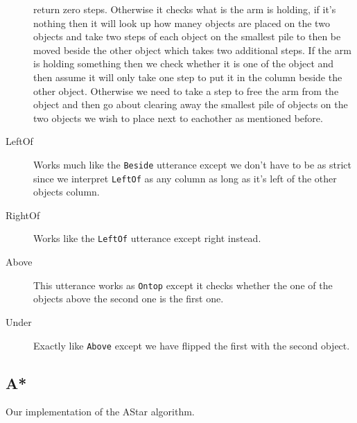 \begin{description}
    return zero steps. Otherwise it checks what is the arm is holding, if it's
    nothing then it will look up how maney objects are placed on the two objects
    and take two steps of each object on the smallest pile to then be moved
    beside the other object which takes two additional steps. If the arm is
    holding something then we check whether it is one of the object and then
    assume it will only take one step to put it in the column beside the other
    object. Otherwise we need to take a step to free the arm from the object and
    then go about clearing away the smallest pile of objects on the two objects
    we wish to place next to eachother as mentioned before.
  \item[LeftOf] Works much like the \verb|Beside| utterance except we don't have
    to be as strict since we interpret \verb|LeftOf| as any column as long as
    it's left of the other objects column.
  \item[RightOf] Works like the \verb|LeftOf| utterance except right instead.
  \item[Above] This utterance works as \verb|Ontop| except it checks whether the
    one of the objects above the second one is the first one.
  \item[Under] Exactly like \verb|Above| except we have flipped the first with
    the second object.
\end{description}

\subsection*{A*}
Our implementation of the AStar algorithm.


